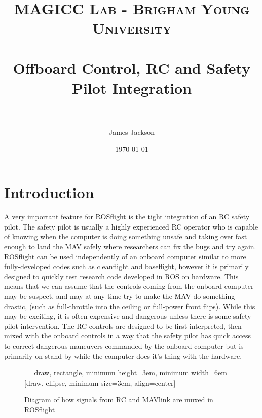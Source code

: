 \documentclass[paper=a4, fontsize=11pt]{scrartcl} %
\title{
\normalfont \normalsize
\textsc{MAGICC Lab - Brigham Young University} \\ [25pt] %
\horrule{0.5pt} \\[0.4cm] %
\huge Offboard Control, RC and Safety Pilot Integration \\ %
\horrule{2pt} \\[0.5cm] %
}
\author{James Jackson} %
\date{\normalsize\today} %
\begin{document}
\maketitle %


\section{Introduction}

A very important feature for ROSflight is the tight integration of an RC safety pilot.  The safety pilot is usually a highly experienced RC operator who is capable of knowing when the computer is doing something unsafe and taking over fast enough to land the MAV safely where researchers can fix the bugs and try again.  ROSflight can be used independently of an onboard computer similar to more fully-developed codes such as cleanflight and baseflight, however it is primarily designed to quickly test research code developed in ROS on hardware.  This means that we can assume that the controls coming from the onboard computer may be suspect, and may at any time try to make the MAV do something drastic, (such as full-throttle into the ceiling or full-power front flips).  While this may be exciting, it is often expensive and dangerous unless there is some safety pilot intervention.  The RC controls are designed to be first interpreted, then mixed with the onboard controls in a way that the safety pilot has quick access to correct dangerous maneuvers commanded by the onboard computer but is primarily on stand-by while the computer does it's thing with the hardware.

\begin{figure}[]
	\centering

	 = [draw, rectangle, 
    					minimum height=3em, minimum width=6em]
  =[draw, ellipse, minimum size=3em,
    					align=center]

  \begin{adjustbox}{max size={\textwidth}{0.2\textheight}}
  \end{adjustbox}

	\label{mux_configuration}
	\caption{Diagram of how signals from RC and MAVlink are muxed in ROSflight}
\end{figure}
\end{document}
